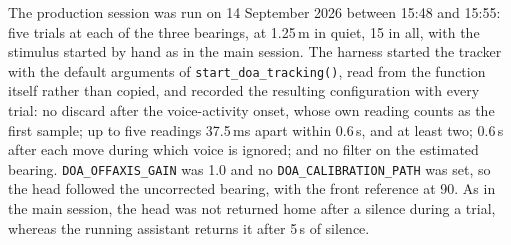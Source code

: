 

The production session was run on 14 September 2026 between 15:48 and 15:55:
five trials at each of the three bearings, at 1.25\,m in quiet, 15 in all, with
the stimulus started by hand as in the main session.
The harness started the tracker with the default arguments of
\texttt{start\_doa\_tracking()}, read from the function itself rather than
copied, and recorded the resulting configuration with every trial: no discard
after the voice-activity onset, whose own reading counts as the first sample; up
to five readings 37.5\,ms apart within 0.6\,s, and at least two; 0.6\,s after
each move during which voice is ignored; and no filter on the estimated bearing.
\texttt{DOA\_OFFAXIS\_GAIN} was 1.0 and no \texttt{DOA\_CALIBRATION\_PATH} was
set, so the head followed the uncorrected bearing, with the front reference at
90\textdegree{}. As in the main session, the head was not returned home after a
silence during a trial, whereas the running assistant returns it after 5\,s of
silence.

